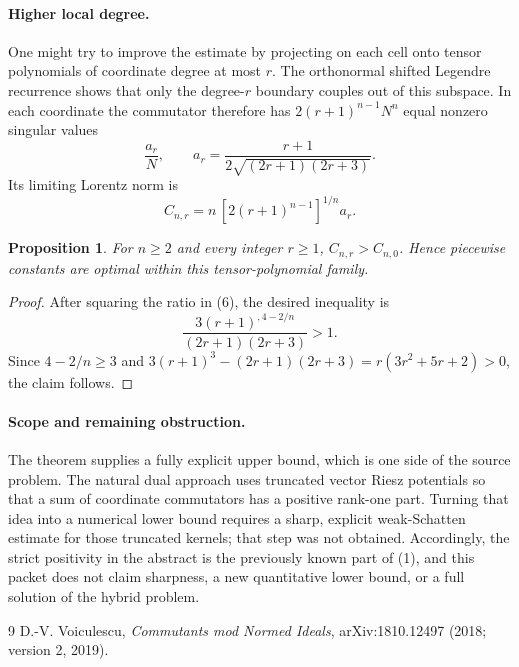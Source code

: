 \documentclass[11pt]{article}
\newtheorem{proposition}[theorem]{Proposition}
\begin{document}
\paragraph{Higher local degree.}
One might try to improve the estimate by projecting on each cell onto tensor
polynomials of coordinate degree at most $r$.  The orthonormal shifted
Legendre recurrence shows that only the degree-$r$ boundary couples out of
this subspace.  In each coordinate the commutator therefore has
$2(r+1)^{n-1}N^n$ equal nonzero singular values
\[
 \frac{a_r}{N},\qquad
 a_r=\frac{r+1}{2\sqrt{(2r+1)(2r+3)}}.
\]
Its limiting Lorentz norm is
\[
 C_{n,r}=n\,[2(r+1)^{n-1}]^{1/n}a_r.                   \tag{6}
\]

\begin{proposition}
For $n\ge2$ and every integer $r\ge1$, $C_{n,r}>C_{n,0}$.
Hence piecewise constants are optimal within this tensor-polynomial family.
\end{proposition}

\begin{proof}
After squaring the ratio in (6), the desired inequality is
\[
 \frac{3(r+1)^{,4-2/n}}{(2r+1)(2r+3)}>1.
\]
Since $4-2/n\ge3$ and
$3(r+1)^3-(2r+1)(2r+3)=r(3r^2+5r+2)>0$, the claim follows.
\end{proof}

\paragraph{Scope and remaining obstruction.}
The theorem supplies a fully explicit upper bound, which is one side of the
source problem.  The natural dual approach uses truncated vector Riesz
potentials so that a sum of coordinate commutators has a positive rank-one
part.  Turning that idea into a numerical lower bound requires a sharp,
explicit weak-Schatten estimate for those truncated kernels; that step was
not obtained.  Accordingly, the strict positivity in the abstract is the
previously known part of (1), and this packet does not claim sharpness, a new
quantitative lower bound, or a full solution of the hybrid problem.

\begin{thebibliography}{9}
D.-V. Voiculescu,
\emph{Commutants mod Normed Ideals},
arXiv:1810.12497 (2018; version 2, 2019).
\end{thebibliography}
\end{document}
